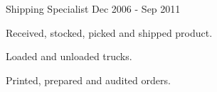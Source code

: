 \begin{cventries}
  \cventry
    {Shipping Specialist}
    {}
    {}
    {Dec 2006 - Sep 2011}
    {
      \begin{cvitems}
       \item {Received, stocked, picked and shipped product.}
       \item {Loaded and unloaded trucks.}
       \item {Printed, prepared and audited orders.}
      \end{cvitems}
    }{}{}


\end{cventries}